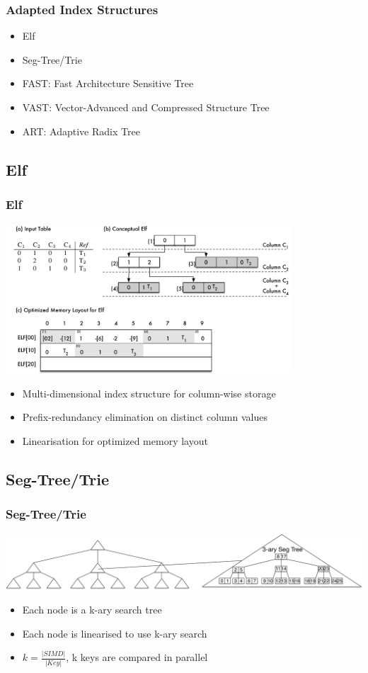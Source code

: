 \documentclass{beamer}
\begin{document}
\begin{frame}
\frametitle{Adapted Index Structures}
\begin{itemize}
	\item Elf
	\item Seg-Tree/Trie
	\item FAST: Fast Architecture Sensitive Tree
	\item VAST: Vector-Advanced and Compressed Structure Tree
	\item ART: Adaptive Radix Tree
\end{itemize}
\end{frame}

\subsection{Elf}
\begin{frame}
	\frametitle{Elf}
	\begin{center}
		\includegraphics[width=0.8\textwidth]{img/elf.pdf}
	\end{center}
	\begin{itemize}
		\item Multi-dimensional index structure for column-wise storage
		\item Prefix-redundancy elimination on distinct column values
		\item Linearisation for optimized memory layout
	\end{itemize}
\end{frame}

\subsection{Seg-Tree/Trie}
\begin{frame}
\frametitle{Seg-Tree/Trie}
\begin{center}
	\includegraphics[width=1.0\textwidth]{img/SegTree.pdf}
\end{center}
\begin{itemize}
	\item Each node is a k-ary search tree
	\item Each node is linearised to use k-ary search
	\item $k = \frac{\vert SIMD \vert }{\vert Key \vert}$, k keys are compared in parallel
\end{itemize}
\end{frame}
\end{document}
